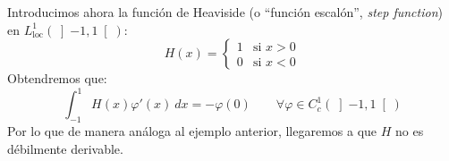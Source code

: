 \noindent
Introducimos ahora la función de Heaviside (o ``función escalón'', \textit{step function}) en $L^1_\text{loc}(\left]-1,1\right[)$:
\begin{equation*}
    H(x) = \left\{\begin{array}{ll}
        1 & \text{si\ } x>0 \\
        0 & \text{si\ } x<0
    \end{array}\right. 
\end{equation*}
Obtendremos que:
\begin{equation}\label{eq:heaviside}
    \int_{-1}^{1} H(x)\varphi'(x)~dx = -\varphi(0) \qquad \forall \varphi \in C_c^1(\left]-1,1\right[)
\end{equation}
Por lo que de manera análoga al ejemplo anterior, llegaremos a que $H$ no es débilmente derivable.\\


